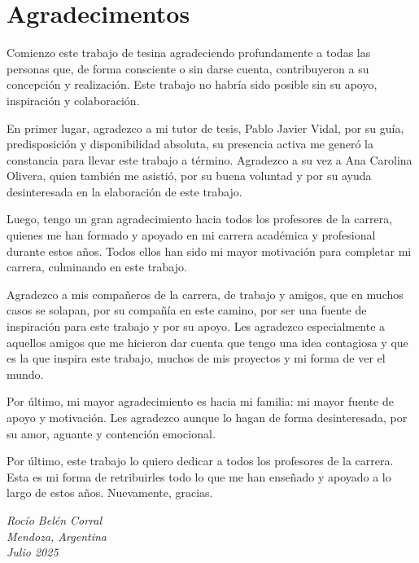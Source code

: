 \chapter*{Agradecimentos}

Comienzo este trabajo de tesina agradeciendo profundamente a todas las personas que, de forma consciente o sin darse cuenta, contribuyeron a su concepción y realización. Este trabajo no habría sido posible sin su apoyo, inspiración y colaboración.

En primer lugar, agradezco a mi tutor de tesis, Pablo Javier Vidal, por su guía, predisposición y disponibilidad absoluta, su presencia activa me generó la constancia para llevar este trabajo a término. Agradezco a su vez a Ana Carolina Olivera, quien también me asistió, por su buena voluntad y por su ayuda desinteresada en la elaboración de este trabajo.

Luego, tengo un gran agradecimiento hacia todos los profesores de la carrera, quienes me han formado y apoyado en mi carrera académica y profesional durante estos años. Todos ellos han sido mi mayor motivación para completar mi carrera, culminando en este trabajo.

Agradezco a mis compañeros de la carrera, de trabajo y amigos, que en muchos casos se solapan, por su compañía en este camino, por ser una fuente de inspiración para este trabajo y por su apoyo. Les agradezco especialmente a aquellos amigos que me hicieron dar cuenta que tengo una idea contagiosa y que es la que inspira este trabajo, muchos de mis proyectos y mi forma de ver el mundo.

Por último, mi mayor agradecimiento es hacia mi familia: mi mayor fuente de apoyo y motivación. Les agradezco aunque lo hagan de forma desinteresada, por su amor, aguante y contención emocional.

Por último, este trabajo lo quiero dedicar a todos los profesores de la carrera. Esta es mi forma de retribuirles todo lo que me han enseñado y apoyado a lo largo de estos años. Nuevamente, gracias.

\begin{flushright}
    \textit{Rocío Belén Corral} \\
		\textit{Mendoza, Argentina} \\
    \textit{Julio 2025}
\end{flushright}

